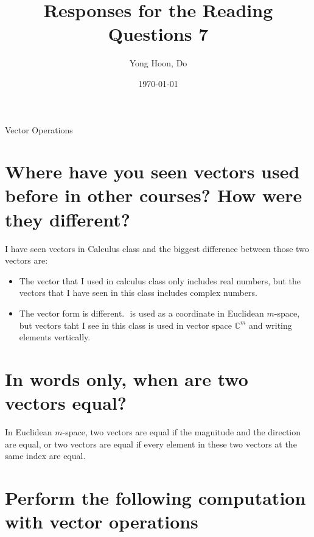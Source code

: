 \documentclass{article}
\title{Responses for the Reading Questions 7}
\author{Yong Hoon, Do}
\date{\today}
\begin{document}
\maketitle

\begin{center}
Vector Operations
\end{center}

\section{Where have you seen vectors used before in other courses? How were they different?}
I have seen vectors in Calculus class and the biggest difference between those two vectors are:
\begin{itemize}
  \item The vector that I used in calculus class only includes real numbers, but the vectors that I have seen in this class includes complex numbers.
  \item The vector form is different. \(<x,y,z>\) is used as a coordinate in Euclidean \(m\)-space, but vectors taht I see in this class is used in vector space \(\mathbb{C}^m\) and writing elements vertically.
\end{itemize}

\section{In words only, when are two vectors equal?}
In Euclidean \(m\)-space, two vectors are equal if the magnitude and the direction are equal, or
two vectors are equal if every element in these two vectors at the same index are equal.

\section{Perform the following computation with vector operations}
\end{document}
